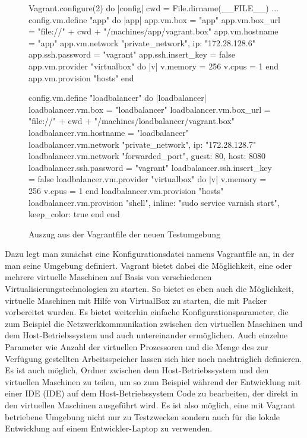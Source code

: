 \begin{figure}[!ht]
  \begin{center}
    \begin{rubycode}
Vagrant.configure(2) do |config|
    cwd = File.dirname(__FILE__)
    ...
    config.vm.define "app" do |app|
        app.vm.box = "app"
        app.vm.box_url = "file://" + cwd + "/machines/app/vagrant.box"
        app.vm.hostname = "app"
        app.vm.network "private_network", ip: "172.28.128.6"
        app.ssh.password = "vagrant"
        app.ssh.insert_key = false
        app.vm.provider "virtualbox" do |v|
            v.memory = 256
            v.cpus = 1
        end
        app.vm.provision "hosts"
    end
    
    config.vm.define "loadbalancer" do |loadbalancer|
        loadbalancer.vm.box = "loadbalancer"     
        loadbalancer.vm.box_url = "file://"
            + cwd + "/machines/loadbalancer/vagrant.box"
        loadbalancer.vm.hostname = "loadbalancer"
        loadbalancer.vm.network "private_network", ip: "172.28.128.7"
        loadbalancer.vm.network "forwarded_port", guest: 80, host: 8080
        loadbalancer.ssh.password = "vagrant"
        loadbalancer.ssh.insert_key = false
        loadbalancer.vm.provider "virtualbox" do |v|
            v.memory = 256
            v.cpus = 1
        end
        loadbalancer.vm.provision "hosts"
        loadbalancer.vm.provision "shell",
            inline: "sudo service varnish start",
            keep_color: true
    end
end
    \end{rubycode}
    \caption{Auszug aus der Vagrantfile der neuen Testumgebung}
    \label{Vagrantfile}
  \end{center}
\end{figure}

Dazu legt man zunächst eine Konfigurationsdatei namens Vagrantfile an, in der man seine Umgebung definiert. Vagrant bietet dabei die Möglichkeit, eine oder mehrere virtuelle Maschinen auf Basis von verschiedenen Virtualisierungstechnologien zu starten. So bietet es eben auch die Möglichkeit, virtuelle Maschinen mit Hilfe von VirtualBox zu starten, die mit Packer vorbereitet wurden. Es bietet weiterhin einfache Konfigurationsparameter, die zum Beispiel die Netzwerkkommunikation zwischen den virtuellen Maschinen und dem Host-Betriebssystem und auch untereinander ermöglichen. Auch einzelne Parameter wie Anzahl der virtuellen Prozessoren und die Menge des zur Verfügung gestellten Arbeitsspeicher lassen sich hier noch nachträglich definieren. Es ist auch möglich, Ordner zwischen dem Host-Betriebssystem und den virtuellen Maschinen zu teilen, um so zum Beispiel während der Entwicklung mit einer IDE (\acl{IDE}) auf dem Host-Betriebssystem Code zu bearbeiten, der direkt in den virtuellen Maschinen ausgeführt wird. Es ist also möglich, eine mit Vagrant betriebene Umgebung nicht nur zu Testzwecken sondern auch für die lokale Entwicklung auf einem Entwickler-Laptop zu verwenden.

